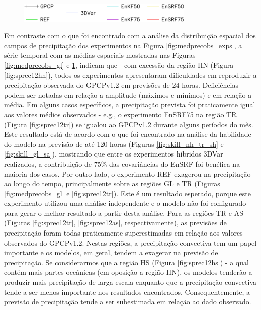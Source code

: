 \begin{figure}[H]
\begin{center}
{        }\\
        \includegraphics[width=0.75\textwidth]{./figs/cap5/aval_prec24h/series_temporais/precip_gpcp_3dvar_3densvar-new_prec_media-artigo-cbar-crop.pdf}
    \end{center}
    \vspace{2mm}
    \label{fig:medprecobs_hntrhsas}
\end{figure}

Em contraste com o que foi encontrado com a análise da distribuição espacial dos campos de precipitação dos experimentos na Figura \ref{fig:medprecobs_exps}, a série temporal com as médias espaciais mostradas nas Figuras \ref{fig:medprecobs_gl} e \ref{fig:medprecobs_hntrhsas}, indicam que - com excessão da região HN (Figura \ref{fig:sprec12hn}), todos os experimentos apresentaram dificuldades em reproduzir a precipitação observada do GPCPv1.2 em previsões de 24 horas. Deficiências podem ser notadas em relação a amplitude (máximos e mínimos) e em relação a média. Em alguns casos específicos, a precipitação prevista foi praticamente igual aos valores médios observados - e.g., o experimento EnSRF75 na região TR (Figura \ref{fig:sprec12tr}) se igualou ao GPCPv1.2 durante alguns períodos do mês. Este resultado está de acordo com o que foi encontrado na análise da habilidade do modelo na previsão de até 120 horas (Figuras \ref{fig:skill_nh_tr_sh} e \ref{fig:skill_gl_sa}), mostrando que entre os experimentos híbridos 3DVar realizados, a contribuição de 75\% das covariâncias do EnSRF foi benéfica na maioria dos casos. Por outro lado, o experimento REF exagerou na precipitação ao longo do tempo, principalmente sobre as regiões GL e TR (Figuras \ref{fig:medprecobs_gl} e \ref{fig:sprec12tr}). Este é um resultado esperado, porque este experimento utilizou uma análise independente e o modelo não foi configurado para gerar o melhor resultado a partir desta análise. Para as regiões TR e AS (Figuras \ref{fig:sprec12tr}, \ref{fig:sprec12as}, respectivamente), as previsões de precipitação foram todas praticamente superestimadas em relação aos valores observados do GPCPv1.2. Nestas regiões, a precipitação convectiva tem um papel importante e os modelos, em geral, tendem a exagerar na previsão de precipitação. Se considerarmos que a região HS (Figura \ref{fig:sprec12hs}) - a qual contém mais partes oceânicas (em oposição a região HN), os modelos tenderão a produzir mais precipitação de larga escala enquanto que a precipitação convectiva tende a ser menos importante nos resultados encontrados. Consequentemente, a previsão de precipitação tende a ser subestimada em relação ao dado observado.

